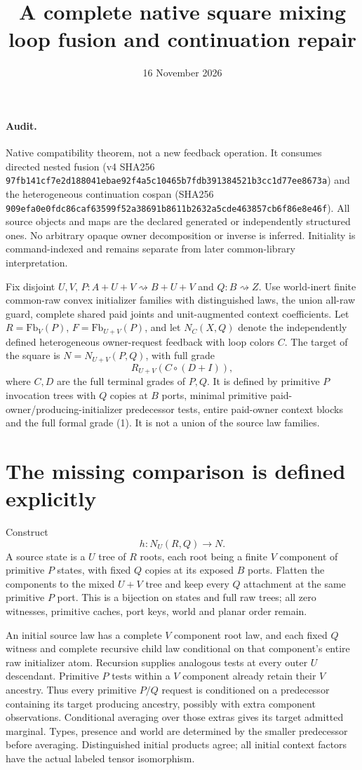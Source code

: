 \documentclass[11pt]{article}\usepackage{amsmath,amssymb,amsthm,geometry}\geometry{margin=1in}\newtheorem{theorem}{Theorem}
\title{A complete native square mixing loop fusion and continuation repair}\date{16 November 2026}
\begin{document}
\maketitle
\paragraph{Audit.} Native compatibility theorem, not a new feedback operation. It consumes directed nested fusion (v4 SHA256 \texttt{97fb141cf7e2d188041ebae92f4a5c10465b7fdb391384521b3cc1d77ee8673a}) and the heterogeneous continuation cospan (SHA256 \texttt{909efa0e0fdc86caf63599f52a38691b8611b2632a5cde463857cb6f86e8e46f}). All source objects and maps are the declared generated or independently structured ones. No arbitrary opaque owner decomposition or inverse is inferred. Initiality is command-indexed and remains separate from later common-library interpretation.

Fix disjoint $U,V$, $P:A+U+V\rightsquigarrow B+U+V$ and $Q:B\rightsquigarrow Z$. Use world-inert finite common-raw convex initializer families with distinguished laws, the union all-raw guard, complete shared paid joints and unit-augmented context coefficients. Let $R=\mathrm{Fb}_V(P)$, $F=\mathrm{Fb}_{U+V}(P)$, and let $N_C(X,Q)$ denote the independently defined heterogeneous owner-request feedback with loop colors $C$. The target of the square is $N=N_{U+V}(P,Q)$, with full grade
\[
                         R_{U+V}(C\circ(D+I)),       \tag{1}
\]
where $C,D$ are the full terminal grades of $P,Q$. It is defined by primitive $P$ invocation trees with $Q$ copies at $B$ ports, minimal primitive paid-owner/producing-initializer predecessor tests, entire paid-owner context blocks and the full formal grade (1). It is not a union of the source law families.

\section{The missing comparison is defined explicitly}
Construct
\[
                 h:N_U(R,Q)\longrightarrow N.         \tag{2}
\]
A source state is a $U$ tree of $R$ roots, each root being a finite $V$ component of primitive $P$ states, with fixed $Q$ copies at its exposed $B$ ports. Flatten the components to the mixed $U+V$ tree and keep every $Q$ attachment at the same primitive $P$ port. This is a bijection on states and full raw trees; all zero witnesses, primitive caches, port keys, world and planar order remain.

An initial source law has a complete $V$ component root law, and each fixed $Q$ witness and complete recursive child law conditional on that component's entire raw initializer atom. Recursion supplies analogous tests at every outer $U$ descendant. Primitive $P$ tests within a $V$ component already retain their $V$ ancestry. Thus every primitive $P/Q$ request is conditioned on a predecessor containing its target producing ancestry, possibly with extra component observations. Conditional averaging over those extras gives its target admitted marginal. Types, presence and world are determined by the smaller predecessor before averaging. Distinguished initial products agree; all initial context factors have the actual labeled tensor isomorphism.
\end{document}
